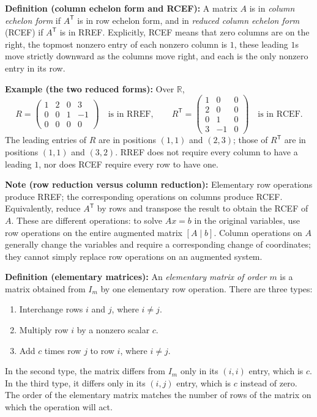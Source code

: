 \documentclass[a4paper,11pt,abstract=true]{scrartcl}
\theoremstyle{dotlessP}
\theoremstyle{dotlessS}
\theoremstyle{remark}
\theoremstyle{definition}
\begin{document}
\begin{claim_box}
\textbf{Definition (column echelon form and RCEF):}
A matrix $A$ is in \emph{column echelon
form} if $A^{\mathsf{T}}$ is in row echelon form, and in
\emph{reduced column echelon form} (RCEF) if $A^{\mathsf{T}}$ is in RREF\@.
Explicitly, RCEF means that zero columns are on the right, the topmost
nonzero entry of each nonzero column is $1$, these leading $1$s move
strictly downward as the columns move right, and each is the only
nonzero entry in its row.
\end{claim_box}

\begin{example_box}
\textbf{Example (the two reduced forms):} Over $\mathbb{R}$,
\[
R=\begin{pmatrix}1&2&0&3\\0&0&1&-1\\0&0&0&0\end{pmatrix}
\quad\text{is in RREF},\qquad
R^{\mathsf{T}}=
\begin{pmatrix}1&0&0\\2&0&0\\0&1&0\\3&-1&0\end{pmatrix}
\quad\text{is in RCEF}.
\]
The leading entries of $R$ are in positions $(1,1)$ and $(2,3)$;
those of $R^{\mathsf{T}}$ are in positions $(1,1)$ and $(3,2)$.
RREF does not require every column to have a leading $1$, nor does
RCEF require every row to have one.
\end{example_box}

\begin{remark_box}
\textbf{Note (row reduction versus column reduction):}
Elementary row operations produce RREF\@; the corresponding operations
on columns produce RCEF\@. Equivalently, reduce $A^{\mathsf{T}}$ by rows
and transpose the result to obtain the RCEF of $A$. These are different
operations: to solve $Ax=b$ in the original variables, use row
operations on the entire augmented matrix $[A\mid b]$. Column
operations on $A$ generally change the variables and require a
corresponding change of coordinates; they cannot simply replace row
operations on an augmented system.
\end{remark_box}

\begin{definition_box}
\textbf{Definition (elementary matrices):} An \emph{elementary
matrix of order $m$} is a matrix obtained from $I_m$ by one elementary
row operation. There are three types:
\begin{enumerate}
    \item Interchange rows $i$ and $j$, where $i\neq j$.
    \item Multiply row $i$ by a nonzero scalar $c$.
    \item Add $c$ times row $j$ to row $i$, where $i\neq j$.
\end{enumerate}
In the second type, the matrix differs from $I_m$ only in its
$(i,i)$ entry, which is $c$. In the third type, it differs only in
its $(i,j)$ entry, which is $c$ instead of zero. The order of the
elementary matrix matches the number of rows of the matrix on which
the operation will act.
\end{definition_box}
\end{document}
